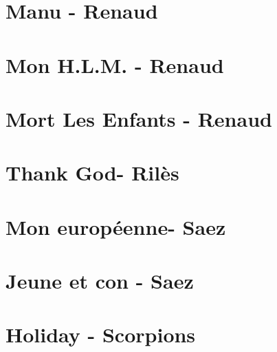\documentclass{guitartabs}
\begin{document}
\section{Manu - Renaud}
\begin{guitar}

\end{guitar}

\section*{Mon H.L.M. - Renaud}
\begin{guitar}

\end{guitar}

\section{Mort Les Enfants - Renaud}
\begin{guitar}

\end{guitar}

\section{Thank God- Rilès}
\begin{guitar}

\end{guitar}

\section{Mon européenne- Saez}
\begin{guitar}

\end{guitar}


\section{Jeune et con - Saez}
\begin{guitar}

\end{guitar}

\section*{Holiday - Scorpions}
\begin{guitar}

\end{guitar}
\end{document}
